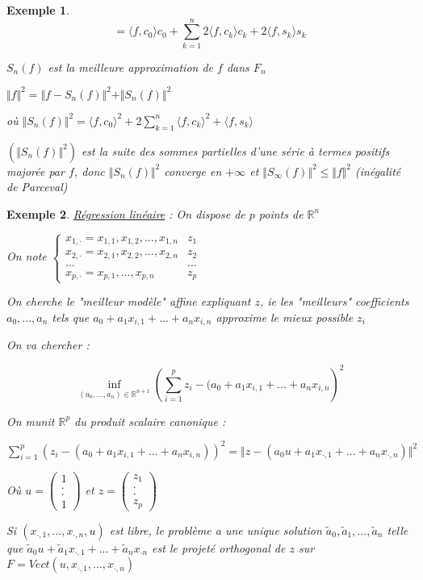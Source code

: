 \documentclass[a4paper,12pt]{book}
\newtheorem{Exe}{Exemple}[section]
\def\R{\mathbb{R}}
\begin{document}
\begin{Exe}
\par $$ = \langle f, c_0\rangle c_0 + \sum\limits_{k=1}^n2\langle f, c_k\rangle c_k +2\langle f, s_k\rangle s_k$$
\par $S_n(f)$ est la meilleure approximation de $f$ dans $F_n$
\par $\Vert f\Vert^2 = \Vert f-S_n(f)\Vert^2+\Vert S_n(f)\Vert^2$
\par où $\Vert S_n(f)\Vert^2 = \langle f, c_0\rangle^2 + 2\sum\limits_{k=1}^n\langle f, c_k\rangle^2 + \langle f, s_k\rangle$
\par $(\Vert S_n(f)\Vert^2)$ est la suite des sommes partielles d'une série à termes positifs majorée par $f$, donc $\Vert S_n(f)\Vert^2$ converge en $+\infty$ et $\Vert S_\infty(f)\Vert^2\leq \Vert f\Vert^2$ (inégalité de Parceval)
\end{Exe}

\begin{Exe}
\underline{Régression linéaire} : On dispose de $p$ points de $\R^n$
\par On note $\left\{\begin{array}{lr}x_{1,\cdot}=x_{1,1}, x_{1, 2},..., x_{1, n} & z_1 \\ x_{2, \cdot} = x_{2,1}, x_{2,2},..., x_{2,n} & z_2 \\ ... & ... \\ x_{p, \cdot} = x_{p, 1},..., x_{p,n} & z_p\end{array}\right.$
\par On cherche le "meilleur modèle" affine expliquant $z$, ie les "meilleurs" coefficients $a_0, ..., a_n$ tels que $a_0 + a_1x_{i,1} +...+a_nx_{i, n}$ approxime le mieux possible $z_i$ 
\par On va chercher :
\par $$\inf\limits_{(a_0,..., a_n)\in\R^{n+1}}\left(\sum_{i=1}^p z_i-(a_0+a_1x_{i,1}+...+a_nx_{i,n}\right)^2$$
\par On munit $\R^p$ du produit scalaire canonique :
\par $\sum\limits_{i=1}^p(z_i-(a_0+a_1x_{i,1}+...+a_nx_{i, n}))^2 = \Vert z - (a_0u+a_1x_{\cdot, 1} + ...+a_nx_{\cdot, n})\Vert^2$
\par Où $u = \begin{pmatrix} 1 \\ .\\.\\ 1\end{pmatrix}$ et $z=\begin{pmatrix} z_1 \\.\\.\\ z_p\end{pmatrix}$
\par Si $(x_{\cdot, 1},..., x_{\cdot, n}, u)$ est libre, le problème a une unique solution $\tilde{a}_0, \tilde{a}_1,..., \tilde{a}_n$ telle que $\tilde{a}_0u + \tilde{a}_1x_{\cdot, 1}+...+\tilde{a}_nx_{\cdot n}$ est le projeté orthogonal de $z$ sur $F = Vect(u, x_{\cdot, 1}, ..., x_{\cdot, n})$
\end{Exe}
\end{document}
